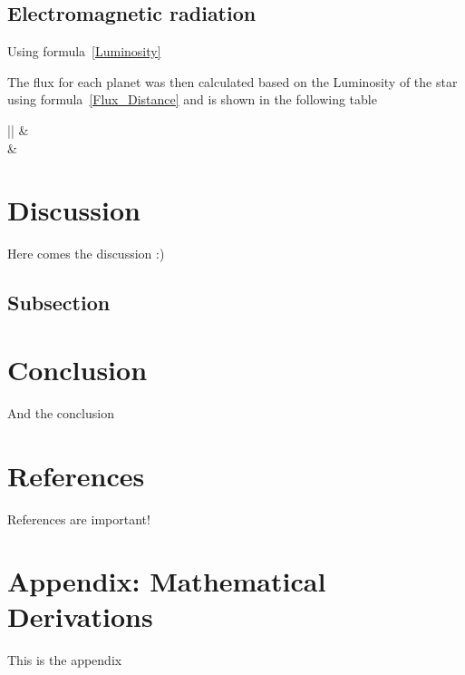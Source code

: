 \documentclass[reprint,english,notitlepage]{revtex4-2}
\begin{document}
	\subsection{Electromagnetic radiation} \label{subsec:res_elmag_radiation}
	Using formula~\eqref{Luminosity}

	The flux for each planet was then calculated based on the Luminosity of the star using formula~\eqref{Flux_Distance} and is shown in the following table
	\begin{table}[]
	    \begin{tabular}{||}
	        \hline
	         & \\
	        \hline
	         &
	        \hline
	    \end{tabular}
	    \caption{}
	    \label{tab:}
	\end{table}


\section{Discussion} \label{sec:discussion}
Here comes the discussion :)
	\subsection{Subsection}

\section{Conclusion} \label{sec:conclusion}
And the conclusion


\section{References} \label{sec:references}
References are important!

\section{Appendix: Mathematical Derivations}
This is the appendix
\end{document}
